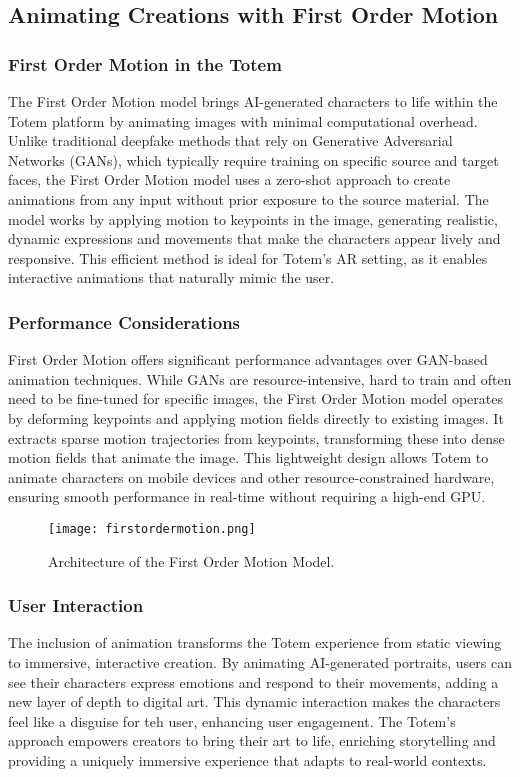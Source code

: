 \subsection{Animating Creations with First Order Motion}

\subsubsection{First Order Motion in the Totem}
The First Order Motion model brings AI-generated characters to life within the Totem platform by animating images with minimal computational overhead. 
Unlike traditional deepfake methods that rely on Generative Adversarial Networks (GANs), which typically require training on specific source and target faces, the First Order Motion model uses a zero-shot approach to create animations from any input without prior exposure to the source material.
The model works by applying motion to keypoints in the image, generating realistic, dynamic expressions and movements that make the characters appear lively and responsive.
This efficient method is ideal for Totem’s AR setting, as it enables interactive animations that naturally mimic the user.

\subsubsection{Performance Considerations}
First Order Motion offers significant performance advantages over GAN-based animation techniques.
While GANs are resource-intensive, hard to train and often need to be fine-tuned for specific images, the First Order Motion model operates by deforming keypoints and applying motion fields directly to existing images.
It extracts sparse motion trajectories from keypoints, transforming these into dense motion fields that animate the image.
This lightweight design allows Totem to animate characters on mobile devices and other resource-constrained hardware, ensuring smooth performance in real-time without requiring a high-end GPU.

\begin{figure}[h]
    \centering
    \texttt{[image: firstordermotion.png]}
    \caption{Architecture of the First Order Motion Model.}
    \vspace{0.1cm}
    \label{fig:firstorderarchitecture}
\end{figure}

\subsubsection{User Interaction}
The inclusion of animation transforms the Totem experience from static viewing to immersive, interactive creation.
By animating AI-generated portraits, users can see their characters express emotions and respond to their movements, adding a new layer of depth to digital art.
This dynamic interaction makes the characters feel like a disguise for teh user, enhancing user engagement.
The Totem’s approach empowers creators to bring their art to life, enriching storytelling and providing a uniquely immersive experience that adapts to real-world contexts.

